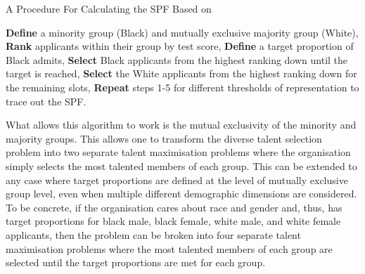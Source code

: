\begin{algorithm}
    \caption{A Procedure For Calculating the SPF Based on \textcite{kleinberg2018algorithmic}}\label{alg:kleinberg}
    \begin{algorithmic}
        \State \textbf{Define} a minority group (Black) and mutually exclusive majority group (White), 
        \State \textbf{Rank} applicants within their group by test score,
        \State \textbf{Define} a target proportion of Black admits,
        \State \textbf{Select} Black applicants from the highest ranking down until the target is reached,
        \State \textbf{Select} the White applicants from the highest ranking down for the remaining slots,
        \State \textbf{Repeat} steps 1-5 for different thresholds of representation to trace out the SPF.
    \end{algorithmic}
\end{algorithm}

What allows this algorithm to work is the mutual exclusivity of the minority and majority groups. This allows one to transform the diverse talent selection problem into two separate talent maximisation problems where the organisation simply selects the most talented members of each group. This can be extended to any case where target proportions are defined at the level of mutually exclusive group level, even when multiple different demographic dimensions are considered. To be concrete, if the organisation cares about race and gender and, thus, has target proportions for black male, black female, white male, and white female applicants, then the problem can be broken into four separate talent maximisation problems where the most talented members of each group are selected until the target proportions are met for each group. 

